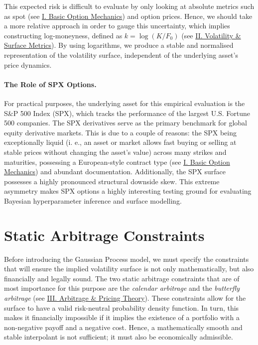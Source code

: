 \documentclass[12pt,oneside]{report}
\theoremstyle{definition}
\theoremstyle{remark}
\begin{document}
This expected risk is difficult to evaluate by only looking at absolute metrics such as spot (see \hyperref[sec:glossary_basic_option_definitions]{I. Basic Option Mechanics}) and option prices. Hence, we should take a more relative approach in order to gauge this uncertainty, which implies constructing log-moneyness, defined as $k = \log(K/F_0)$ (see \hyperref[sec:glossary_volatility_surface_metrics]{II. Volatility \& Surface Metrics}). By using logarithms, we produce a stable and normalised representation of the volatility surface, independent of the underlying asset’s price dynamics.

\paragraph{The Role of SPX Options.}
For practical purposes, the underlying asset for this empirical evaluation is the S\&P 500 Index (SPX), which tracks the performance of the largest U.S. Fortune 500 companies. The SPX derivatives serve as the primary benchmark for global equity derivative markets. This is due to a couple of reasons: the SPX being exceptionally liquid (i. e., an asset or market allows fast buying or selling at stable prices without changing the asset's value) across many strikes and maturities, possessing a European-style contract type (see \hyperref[sec:glossary_basic_option_definitions]{I. Basic Option Mechanics}) and abundant documentation. Additionally, the SPX surface possesses a highly pronounced structural downside skew. This extreme asymmetry makes SPX options a highly interesting testing ground for evaluating Bayesian hyperparameter inference and surface modelling.

\section{Static Arbitrage Constraints}
\label{subsec:static-arbitrage}
Before introducing the Gaussian Process model, we must specify the constraints that will ensure the implied volatility surface is not only mathematically, but also financially and legally sound. The two static arbitrage constraints that are of most importance for this purpose are the \emph{calendar arbitrage} and the \emph{butterfly arbitrage} (see \hyperref[sec:glossary_arbitrage_pricing_theory]{III. Arbitrage \& Pricing Theory}). These constraints allow for the surface to have a valid risk-neutral probability density function. In turn, this makes it financially impossible if it implies the existence of a portfolio with a non-negative payoff and a negative cost. Hence, a mathematically smooth and stable interpolant is not sufficient; it must also be economically admissible.
\end{document}
